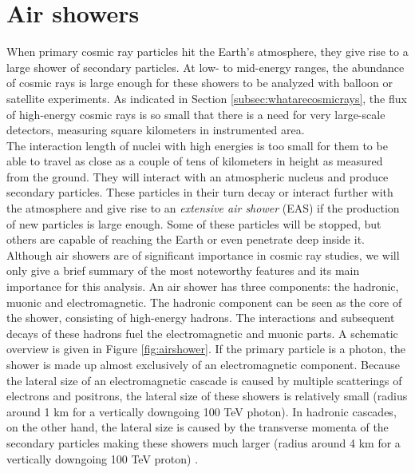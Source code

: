 \section{Air showers}
\label{sec:airshowers}
When primary cosmic ray particles hit the Earth's atmosphere, they give rise to a large shower of secondary particles. At low- to mid-energy ranges, the abundance of cosmic rays is large enough for these showers to be analyzed with balloon or satellite experiments. As indicated in Section \ref{subsec:whatarecosmicrays}, the flux of high-energy cosmic rays is so small that there is a need for very large-scale detectors, measuring square kilometers in instrumented area.\\
\newline
The interaction length of nuclei with high energies is too small for them to be able to travel as close as a couple of tens of kilometers in height as measured from the ground. They will interact with an atmospheric nucleus and produce secondary particles.
These particles in their turn decay or interact further with the atmosphere and give rise to an \textit{extensive air shower} (EAS) if the production of new particles is large enough. Some of these particles will be stopped, but others are capable of reaching the Earth or even penetrate deep inside it. 
Although air showers are of significant importance in cosmic ray studies, we will only give a brief summary of the most noteworthy features and its main importance for this analysis.
An air shower has three components: the hadronic, muonic and electromagnetic. The hadronic component can be seen as the core of the shower, consisting of high-energy hadrons. The interactions and subsequent decays of these hadrons fuel the electromagnetic and muonic parts. A schematic overview is given in Figure \ref{fig:airshower}. If the primary particle is a photon, the shower is made up almost exclusively of an electromagnetic component. Because the lateral size of an electromagnetic cascade is caused by multiple scatterings of electrons and positrons, the lateral size of these showers is relatively small (radius around 1 km for a vertically downgoing 100 TeV photon). In hadronic cascades, on the other hand, the lateral size is caused by the transverse momenta of the secondary particles making these showers much larger (radius around 4 km for a vertically downgoing 100 TeV proton) \cite{Grupen:2005rx}.

